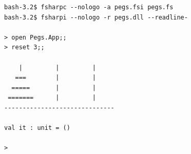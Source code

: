 \documentclass[rgb]{beamer}
\begin{document}
\begin{frame}[fragile]
\begin{footnotesize}

  \vspace{1ex}

\begin{verbatim}
bash-3.2$ fsharpc --nologo -a pegs.fsi pegs.fs
bash-3.2$ fsharpi --nologo -r pegs.dll --readline-

> open Pegs.App;;
> reset 3;;

    |         |         |
   ===        |         |
  =====       |         |
 =======      |         |
------------------------------

val it : unit = ()

>
\end{verbatim}

\end{footnotesize}
\end{frame}
\end{document}
